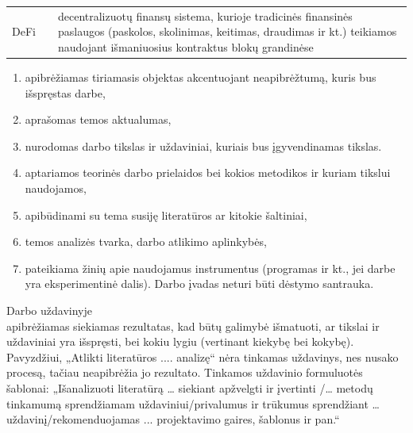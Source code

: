 \documentclass[]{VUMIFTemplateClass}
\newcommand{\EE}{\mathbb{E}\,} %
\begin{document}



\begin{tabular}{rcp{}}
    {DeFi} & {} & {decentralizuotų finansų sistema, kurioje tradicinės finansinės paslaugos (paskolos, skolinimas, keitimas, draudimas ir kt.) teikiamos naudojant išmaniuosius kontraktus blokų grandinėse}
\end{tabular}

\begin{enumerate}
    \item apibrėžiamas tiriamasis objektas akcentuojant neapibrėžtumą, kuris bus išspręstas darbe,
    \item aprašomas temos aktualumas,
    \item nurodomas darbo tikslas ir uždaviniai, kuriais bus įgyvendinamas tikslas.
    \item aptariamos teorinės darbo prielaidos bei kokios metodikos ir kuriam tikslui naudojamos,
    \item apibūdinami su tema susiję literatūros ar kitokie šaltiniai,
    \item temos analizės tvarka, darbo atlikimo aplinkybės,
    \item pateikiama žinių apie naudojamus instrumentus (programas ir kt., jei darbe yra eksperimentinė dalis). Darbo įvadas neturi būti dėstymo santrauka. 
\end{enumerate}

Darbo uždavinyje\\
apibrėžiamas siekiamas rezultatas, kad būtų galimybė išmatuoti, ar tikslai ir
uždaviniai yra išspręsti, bei kokiu lygiu (vertinant kiekybę bei kokybę). Pavyzdžiui, „Atlikti literatūros
.... analizę“ nėra tinkamas uždavinys, nes nusako procesą, tačiau neapibrėžia jo rezultato. Tinkamos
uždavinio formuluotės šablonai: „Išanalizuoti literatūrą … siekiant apžvelgti ir įvertinti /… metodų
tinkamumą sprendžiamam uždaviniui/privalumus ir trūkumus sprendžiant … uždavinį/rekomenduojamas ... projektavimo gaires, šablonus ir pan.“
\end{document}
